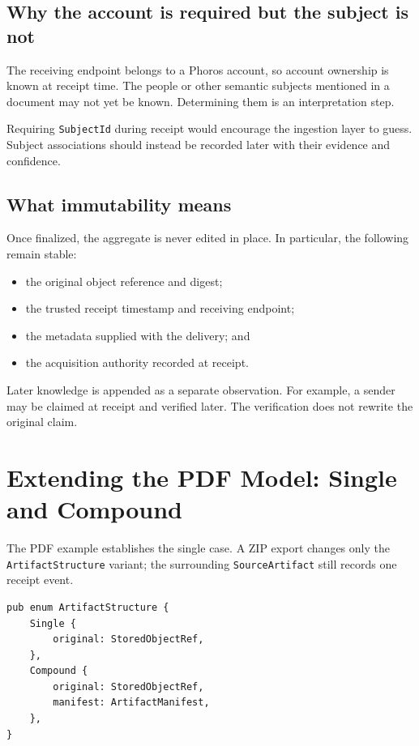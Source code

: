 \documentclass[11pt]{article}
\newcommand{\code}[1]{\texttt{#1}}
\begin{document}
\subsection{Why the account is required but the subject is not}

The receiving endpoint belongs to a Phoros account, so account ownership is known at receipt time. The people or other semantic subjects mentioned in a document may not yet be known. Determining them is an interpretation step.

Requiring \code{SubjectId} during receipt would encourage the ingestion layer to guess. Subject associations should instead be recorded later with their evidence and confidence.

\subsection{What immutability means}

Once finalized, the aggregate is never edited in place. In particular, the following remain stable:

\begin{itemize}
  \item the original object reference and digest;
  \item the trusted receipt timestamp and receiving endpoint;
  \item the metadata supplied with the delivery; and
  \item the acquisition authority recorded at receipt.
\end{itemize}

Later knowledge is appended as a separate observation. For example, a sender may be claimed at receipt and verified later. The verification does not rewrite the original claim.

\Needspace{0.55\textheight}
\section{Extending the PDF Model: Single and Compound}

The PDF example establishes the single case. A ZIP export changes only the \code{ArtifactStructure} variant; the surrounding \code{SourceArtifact} still records one receipt event.

\begin{lstlisting}
pub enum ArtifactStructure {
    Single {
        original: StoredObjectRef,
    },
    Compound {
        original: StoredObjectRef,
        manifest: ArtifactManifest,
    },
}
\end{lstlisting}
\end{document}
